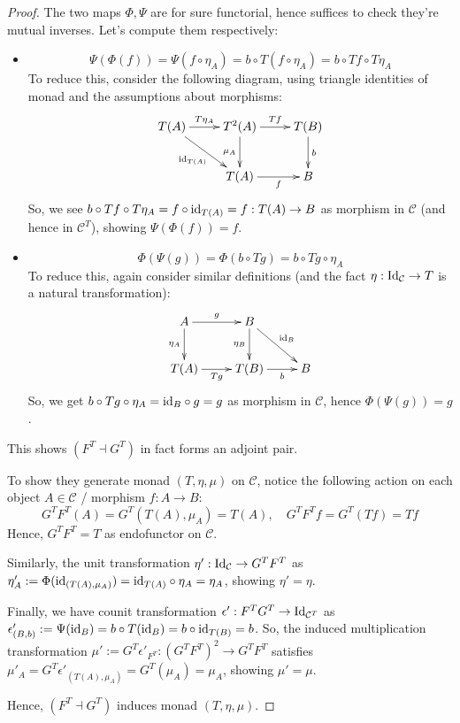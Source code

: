 \documentclass{article}
\begin{document}
\begin{proof}
    The two maps $\Phi,\Psi$ are for sure functorial, hence suffices to check they're mutual inverses. Let's compute them respectively:
    \begin{itemize}
        \item \[\Psi(\Phi(f)) = \Psi(f\circ \eta_A) = b\circ T(f\circ \eta_A)= b\circ Tf\circ T\eta_A\]
        To reduce this, consider the following diagram, using triangle identities of monad and the assumptions about morphisms:
        \[\xymatrix{
            T(A) \ar[dr]_-{\id_{T(A)}} \ar[r]^-{T\eta_A}& T^2(A) \ar[d]_-{\mu_A} \ar[r]^-{Tf} & T(B) \ar[d]^-{b}\\
            & T(A) \ar[r]_-{f} & B
        }\]
        So, we see $b\circ Tf \circ T\eta_A = f\circ \mathrm{id}_{T(A)}=f:T(A)\rightarrow B$ as morphism in $\mathcal{C}$ (and hence in $\mathcal{C}^T$), showing $\Psi(\Phi(f))=f$.
        \item \[\Phi(\Psi(g)) = \Phi(b\circ Tg)= b\circ Tg \circ \eta_A\]
        To reduce this, again consider similar definitions (and the fact $\eta:\mathrm{Id}_\mathcal{C}\rightarrow T$ is a natural transformation):
        \[\xymatrix{
            A \ar[r]^-{g} \ar[d]_-{\eta_A} & B \ar[d]_-{\eta_B} \ar[dr]^-{\id_B}\\
            T(A) \ar[r]_-{Tg} & T(B) \ar[r]_-{b} & B
        }\]
        So, we get $b\circ Tg\circ \eta_A = \mathrm{id}_B\circ g=g$ as morphism in $\mathcal{C}$, hence $\Phi(\Psi(g))=g$.
    \end{itemize}
    This shows $(F^T\dashv G^T)$ in fact forms an adjoint pair.

    \hfil

    To show they generate monad $(T,\eta,\mu)$ on $\mathcal{C}$, notice the following action on each object $A\in\mathcal{C}$ / morphism $f:A\rightarrow B$:
    \[G^T F^T(A) = G^T(T(A),\mu_A) = T(A),\quad G^T F^T f = G^T(T f) = Tf\]
    Hence, $G^T F^T = T$ as endofunctor on $\mathcal{C}$.

    Similarly, the unit transformation $\eta':\mathrm{Id}_\mathcal{C}\rightarrow G^T F^T$ as $\eta'_A := \Phi(\mathrm{id}_{(T(A),\mu_A)}) = \mathrm{id}_{T(A)}\circ \eta_A = \eta_A$, showing $\eta'=\eta$.

    Finally, we have counit transformation $\epsilon':F^TG^T \rightarrow \mathrm{Id}_{\mathcal{C}^T}$ as $\epsilon'_{(B,b)}:= \Psi(\mathrm{id}_B) = b\circ T(\mathrm{id}_B) = b\circ \mathrm{id}_{T(B)}=b$. So, the induced multiplication transformation $\mu' := G^T \epsilon'_{F^T}:(G^T F^T)^2\rightarrow G^T F^T$ satisfies $\mu'_A = G^T \epsilon'_{(T(A),\mu_A)} = G^T(\mu_A) = \mu_A$, showing $\mu'=\mu$.

    Hence, $(F^T\dashv G^T)$ induces monad $(T,\eta,\mu)$.
\end{proof}
\end{document}
